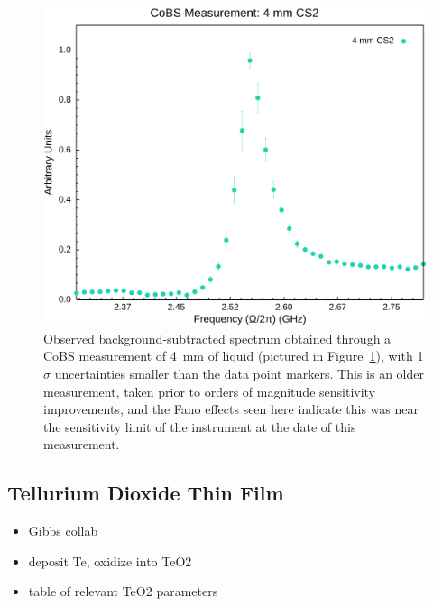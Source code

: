 \begin{figure}[t]
  \centering
  \hspace{-2em}\includegraphics[width=.85\textwidth]{figs/4-Raman/CoBS Measurement: 4 mm CS2.png}
  \caption[\ac{CoBS} measurement of \SI{4}{\milli\meter} liquid .]{Observed background-subtracted spectrum obtained through a \ac{CoBS} measurement of \SI{4}{\milli\meter} of liquid  (pictured in Figure~\ref{fig:Raman:4mmCS2}), with 1\(\sigma\) uncertainties smaller than the data point markers. This is an older measurement, taken prior to orders of magnitude sensitivity improvements, and the Fano effects seen here indicate this was near the sensitivity limit of the instrument at the date of this measurement.}
  \label{fig:Raman:4mmCS2}
\end{figure}

\subsection{Tellurium Dioxide Thin Film}
\label{subsec:Raman:Target:TeO2}

\begin{itemize}
  \item Gibbs collab
  \item deposit Te, oxidize into TeO2
  \item table of relevant TeO2 parameters
\end{itemize}

